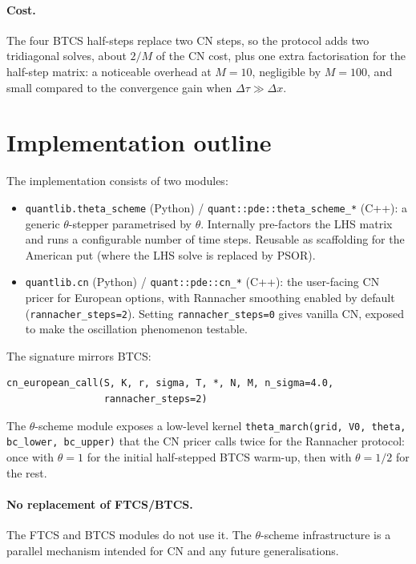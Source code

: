 \documentclass[11pt,a4paper]{article}
\begin{document}
\paragraph{Cost.} The four BTCS half-steps replace two CN steps, so the
protocol adds two tridiagonal solves, about $2/M$ of the CN cost, plus
one extra factorisation for the half-step matrix: a noticeable overhead
at $M = 10$, negligible by $M = 100$, and small compared to the
convergence gain when $\Delta\tau \gg \Delta x$.

\section{Implementation outline}

The implementation consists of two modules:
\begin{itemize}[leftmargin=2em]
\item \texttt{quantlib.theta\_scheme} (Python) /
\texttt{quant::pde::theta\_scheme\_*} (C++): a generic $\theta$-stepper
parametrised by $\theta$. Internally pre-factors the LHS matrix and
runs a configurable number of time steps. Reusable as scaffolding
for the American put (where the LHS solve is replaced by PSOR).
\item \texttt{quantlib.cn} (Python) /
\texttt{quant::pde::cn\_*} (C++): the user-facing CN pricer for
European options, with Rannacher smoothing enabled by default
(\texttt{rannacher\_steps=2}). Setting \texttt{rannacher\_steps=0}
gives vanilla CN, exposed to make the oscillation phenomenon
testable.
\end{itemize}

The signature mirrors BTCS:
\begin{verbatim}
cn_european_call(S, K, r, sigma, T, *, N, M, n_sigma=4.0,
                 rannacher_steps=2)
\end{verbatim}

The $\theta$-scheme module exposes a low-level kernel
\texttt{theta\_march(grid, V0, theta, bc\_lower, bc\_upper)} that the
CN pricer calls twice for the Rannacher protocol: once with
$\theta = 1$ for the initial half-stepped BTCS warm-up, then with
$\theta = 1/2$ for the rest.

\paragraph{No replacement of FTCS/BTCS.} The FTCS and BTCS modules
do not use it. The $\theta$-scheme infrastructure is a
parallel mechanism intended for CN and any future generalisations.
\end{document}
